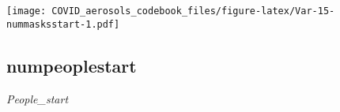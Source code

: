\documentclass[]{article}
\begin{document}
\begin{minipage}{0.25 \textwidth}

\texttt{[image: COVID\_aerosols\_codebook\_files/figure-latex/Var-15-nummasksstart-1.pdf]}

\end{minipage}

\noindent\makebox[\linewidth]{\rule{\textwidth}{0.4pt}}

\hypertarget{numpeoplestart}{%
\subsection{numpeoplestart}\label{numpeoplestart}}

\emph{People\_start}

\begin{minipage}{0.75 \textwidth}


\end{minipage}
\end{document}
